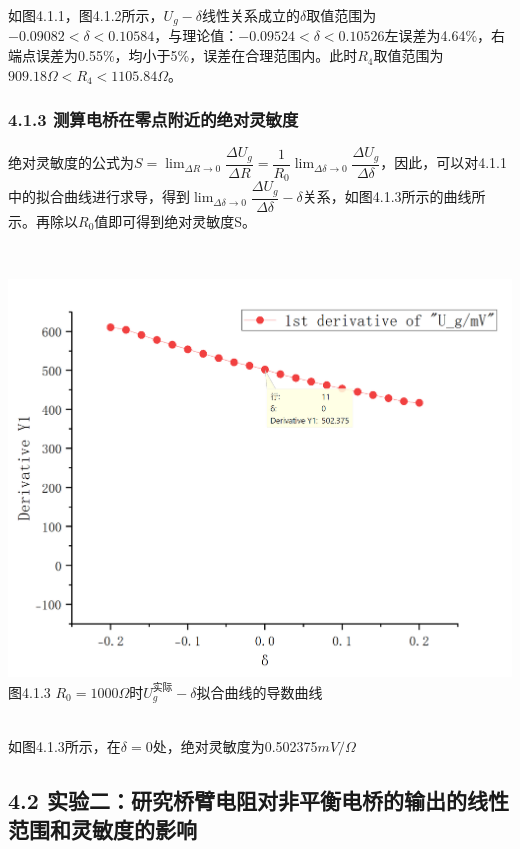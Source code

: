 \documentclass{ctexart}
\begin{document}
    如图4.1.1，图4.1.2所示，$U_g - \delta$线性关系成立的$\delta$取值范围为$-0.09082<\delta<0.10584$，与理论值：$-0.09524<\delta<0.10526$左误差为4.64\%，右端点误差为0.55\%，均小于5\%，误差在合理范围内。此时$R_4$取值范围为$909.18\Omega<R_4<1105.84\Omega$。
    \subsubsection*{4.1.3 测算电桥在零点附近的绝对灵敏度}

    绝对灵敏度的公式为$S=\lim_{\Delta R \to 0}\dfrac{\Delta U_g}{\Delta R} =\dfrac{1}{R_0} \lim_{\Delta \delta \to 0}\dfrac{\Delta U_g}{\Delta \delta} $，因此，可以对4.1.1中的拟合曲线进行求导，得到$\lim_{\Delta \delta \to 0}\dfrac{\Delta U_g}{\Delta \delta} -\delta$关系，如图4.1.3所示的曲线所示。再除以$R_0$值即可得到绝对灵敏度S。
    
    ~\\
    \begin{minipage}[c]{1\textwidth}
        \centering \includegraphics[scale=0.4]{1.1.3} \\\small{图4.1.3 $R_0=1000\Omega$时$U_g^{\text{实际}} - \delta$拟合曲线的导数曲线}
    \end{minipage}
    ~\\

    如图4.1.3所示，在$\delta=0$处，绝对灵敏度为0.502375$mV/\Omega$

    \subsection*{4.2 \quad 实验二：研究桥臂电阻对非平衡电桥的输出的线性范围和灵敏度的影响}
\end{document}
